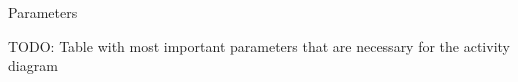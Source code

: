 \begin{frame}[t]{Parameters}{}

TODO: Table with most important parameters that are necessary for the activity diagram

\end{frame}
